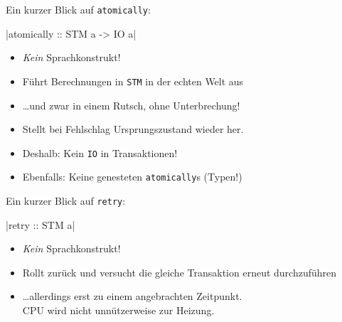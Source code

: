 \documentclass{beamer}
\begin{document}
\begin{frame}[fragile]

Ein kurzer Blick auf \texttt{atomically}:

|atomically :: STM a -> IO a|
\pause

\begin{itemize}
\item \emph{Kein} Sprachkonstrukt!\pause
\item Führt Berechnungen in \texttt{STM} in der echten Welt aus\pause
\item \dots und zwar in einem Rutsch, ohne Unterbrechung!\pause
\item Stellt bei Fehlschlag Ursprungszustand wieder her.\pause
\item Deshalb: Kein \texttt{IO} in Transaktionen!\pause
\item Ebenfalls: Keine genesteten \texttt{atomically}s (Typen!) 
\end{itemize}
\end{frame}


\begin{frame}[fragile]

Ein kurzer Blick auf \texttt{retry}:

|retry :: STM a|
\pause

\begin{itemize}
\item \emph{Kein} Sprachkonstrukt!\pause
\item Rollt zurück und versucht die gleiche Transaktion erneut durchzuführen\pause
\item \dots allerdings erst zu einem angebrachten Zeitpunkt.\\ CPU wird nicht unnützerweise zur Heizung.
\end{itemize}
\end{frame}

\end{document}
